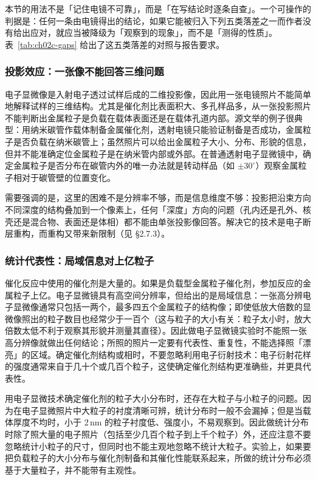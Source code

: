 \begin{methodsum}
本节的用法不是「记住电镜不可靠」，而是「在写结论时逐条自查」。一个可操作的判据是：任何一条由电镜得出的结论，如果它能被归入下列五类落差之一而作者没有给出应对，就应当被降级为「观察到的现象」，而不是「测得的性质」。表~\ref{tab:ch02c-gaps} 给出了这五类落差的对照与报告要求。
\end{methodsum}

\subsubsection{投影效应：一张像不能回答三维问题}

电子显微像是入射电子透过试样后成的二维投影像，因此用一张电镜照片不能简单地解释试样的三维结构。尤其是催化剂比表面积大、多孔样品多，从一张投影照片不能判断出金属粒子是负载在载体表面还是在载体孔道内部。源文举的例子很典型：用纳米碳管作载体制备金属催化剂，透射电镜只能验证制备是否成功，金属粒子是否负载在纳米碳管上；虽然照片可以给出金属粒子大小、分布、形貌的信息，但并不能准确定位金属粒子是在纳米管内部或外部。在普通透射电子显微镜中，确定金属粒子是否分布在碳管内外的唯一办法就是转动样品（如 $\pm 30^\circ$）观察金属粒子相对于碳管壁的位置变化。

需要强调的是，这里的困难不是分辨率不够，而是信息维度不够：投影把沿束方向不同深度的结构叠加到一个像素上，任何「深度」方向的问题（孔内还是孔外、核壳还是混合物、表面还是体相）都不能由单张投影像回答。解决它的技术是电子断层重构，而重构又带来新限制（见 \S 2.7.3）。

\subsubsection{统计代表性：局域信息对上亿粒子}

催化反应中使用的催化剂是大量的。如果是负载型金属粒子催化剂，参加反应的金属粒子上亿。电子显微镜具有高空间分辨率，但给出的是局域信息：一张高分辨电子显微像通常只包括一两个，最多四五个金属粒子的结构像；即使低放大倍数的显微像照出的粒子数目也经常少于一百个（这与粒子的大小有关：粒子太小时，放大倍数太低不利于观察其形貌并测量其直径）。因此做电子显微镜实验时不能照一张高分辨像就做出任何结论；所照的照片一定要有代表性、重复性，不能选择照「漂亮」的区域。确定催化剂结构或相时，不要忽略利用电子衍射技术：电子衍射花样的强度通常来自于几十个或几百个粒子，这使确定催化剂结构更准确些，并更具代表性。

用电子显微技术确定催化剂的粒子大小分布时，还存在大粒子与小粒子的问题。因为在电子显微照片中大粒子的衬度清晰可辨，统计分布时一般不会漏掉；但是当载体厚度不均时，小于 2\,nm 的粒子衬度低、强度小，不易观察到。因此做统计分布时除了照大量的电子照片（包括至少几百个粒子到上千个粒子）外，还应注意不要忽略统计小粒子的尺寸，但同时也不能主观地忽略不统计大粒子。实验上，如果要把负载粒子的大小分布与催化剂制备和其催化性能联系起来，所做的统计分布必须基于大量粒子，并不能带有主观性。

